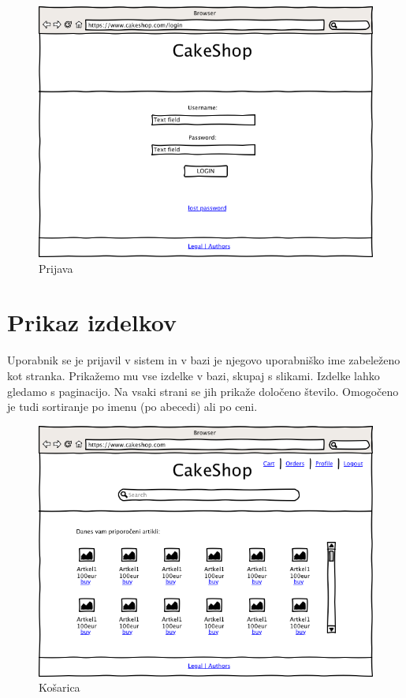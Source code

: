 \documentclass[a4paper,12pt]{report}
\begin{document}
\begin{figure}[htb]
	\centering
	\includegraphics[width=13cm]{Wireframes/cakeshop/pngs/010200-LoginAnonymous.png}
	\caption{Prijava}
\label{fig:1}
\end{figure}

\newpage

\section{Prikaz izdelkov}

Uporabnik se je prijavil v sistem in v bazi je njegovo uporabniško ime zabeleženo kot stranka. Prikažemo mu vse izdelke v bazi, skupaj s slikami. Izdelke lahko gledamo s paginacijo. Na vsaki strani se jih prikaže določeno število. Omogočeno je tudi sortiranje po imenu (po abecedi) ali po ceni.

\begin{figure}[htb]
	\centering
	\includegraphics[width=13cm]{Wireframes/cakeshop/pngs/020000-IndexClient.png}
	\caption{Košarica}
\label{fig:2}
\end{figure}
\end{document}

